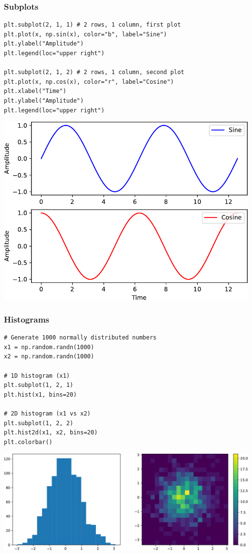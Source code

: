 \documentclass[xcolor=table]{beamer}
\begin{document}
\begin{frame}[fragile]
\frametitle{Subplots}

\begin{lstlisting}[style=python]
plt.subplot(2, 1, 1) # 2 rows, 1 column, first plot
plt.plot(x, np.sin(x), color="b", label="Sine")
plt.ylabel("Amplitude")
plt.legend(loc="upper right")

plt.subplot(2, 1, 2) # 2 rows, 1 column, second plot
plt.plot(x, np.cos(x), color="r", label="Cosine")
plt.xlabel("Time")
plt.ylabel("Amplitude")
plt.legend(loc="upper right")
\end{lstlisting}

\vspace{-0.5cm}
\begin{center}
	\includegraphics[width=.4\textwidth]{plot2.pdf}
\end{center}

\end{frame}

\begin{frame}[fragile]
\frametitle{Histograms}

\begin{lstlisting}[style=python]
# Generate 1000 normally distributed numbers
x1 = np.random.randn(1000) 
x2 = np.random.randn(1000) 

# 1D histogram (x1)
plt.subplot(1, 2, 1)
plt.hist(x1, bins=20)

# 2D histogram (x1 vs x2)
plt.subplot(1, 2, 2)
plt.hist2d(x1, x2, bins=20)
plt.colorbar()
\end{lstlisting}

\vspace{-0.6cm}
\begin{center}
	\includegraphics[width=.72\textwidth]{plot3.pdf}
\end{center}

\end{frame}
\end{document}

